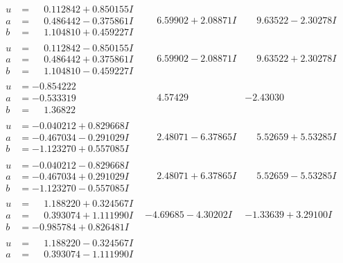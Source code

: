 \documentclass[1p]{elsarticle_modified}
\theoremstyle{definition}
\begin{document}
$$\begin{array}{c|c|c}
\begin{aligned}
u &= \phantom{-}0.112842 + 0.850155 I \\
a &= \phantom{-}0.486442 - 0.375861 I \\
b &= \phantom{-}1.104810 + 0.459227 I\end{aligned}
 & \phantom{-}6.59902 + 2.08871 I & \phantom{-}9.63522 - 2.30278 I \\ \hline\begin{aligned}
u &= \phantom{-}0.112842 - 0.850155 I \\
a &= \phantom{-}0.486442 + 0.375861 I \\
b &= \phantom{-}1.104810 - 0.459227 I\end{aligned}
 & \phantom{-}6.59902 - 2.08871 I & \phantom{-}9.63522 + 2.30278 I \\ \hline\begin{aligned}
u &= -0.854222\phantom{ +0.000000I} \\
a &= -0.533319\phantom{ +0.000000I} \\
b &= \phantom{-}1.36822\phantom{ +0.000000I}\end{aligned}
 & \phantom{-}4.57429\phantom{ +0.000000I} & -2.43030\phantom{ +0.000000I} \\ \hline\begin{aligned}
u &= -0.040212 + 0.829668 I \\
a &= -0.467034 - 0.291029 I \\
b &= -1.123270 + 0.557085 I\end{aligned}
 & \phantom{-}2.48071 - 6.37865 I & \phantom{-}5.52659 + 5.53285 I \\ \hline\begin{aligned}
u &= -0.040212 - 0.829668 I \\
a &= -0.467034 + 0.291029 I \\
b &= -1.123270 - 0.557085 I\end{aligned}
 & \phantom{-}2.48071 + 6.37865 I & \phantom{-}5.52659 - 5.53285 I \\ \hline\begin{aligned}
u &= \phantom{-}1.188220 + 0.324567 I \\
a &= \phantom{-}0.393074 + 1.111990 I \\
b &= -0.985784 + 0.826481 I\end{aligned}
 & -4.69685 - 4.30202 I & -1.33639 + 3.29100 I \\ \hline\begin{aligned}
u &= \phantom{-}1.188220 - 0.324567 I \\
a &= \phantom{-}0.393074 - 1.111990 I \\

\end{aligned}
\end{array}$$
\end{document}
